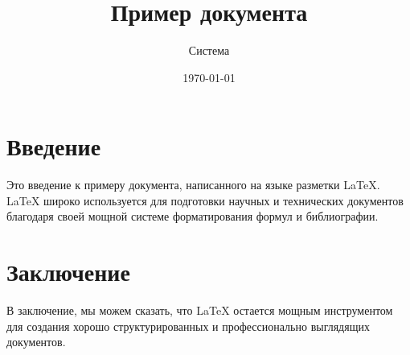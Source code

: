 \documentclass{article}
\title{Пример документа}
\author{Система}
\date{\today}
\begin{document}
\maketitle

\section{Введение}
Это введение к примеру документа, написанного на языке разметки LaTeX.
LaTeX широко используется для подготовки научных и технических документов благодаря своей мощной системе форматирования формул и библиографии.

\section{Заключение}
В заключение, мы можем сказать, что LaTeX остается мощным инструментом для создания хорошо структурированных и профессионально выглядящих документов.
\end{document}
